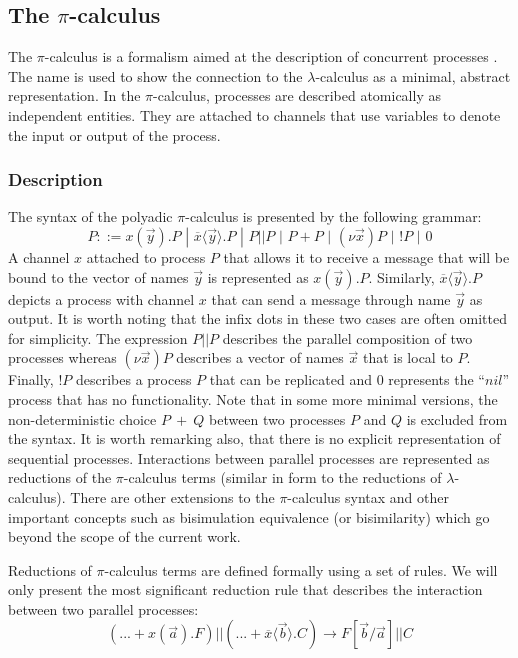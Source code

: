 \documentclass[copyright,creativecommons]{eptcs}
\begin{document}
\subsection{The $\pi$-calculus}
\label{pi}

The $\pi$-calculus is a formalism aimed at the description of concurrent processes \cite{milner1999communicating}. The name is used to show the connection to the $\lambda$-calculus as a minimal, abstract representation. In the $\pi$-calculus, processes are described atomically as independent entities. They are attached to channels that use variables to denote the input or output of the process. 

\subsubsection{Description}
\label{pidesc}


The syntax of the polyadic $\pi$-calculus is presented by the following grammar:
\[ 
P ::= x(\vec{y}).P \,\,|\,\, \overline{x} \langle \vec{y} \rangle.P \,\,|\,\, P || P \,\,|\,\, P + P \,\,|\,\,(\nu \vec{x})P \,\,|\,\, !P \,\,|\,\, 0 
  \]
A channel $x$ attached to process $P$ that allows it to receive a message that will be bound to the vector of names $\vec{y}$ is represented as $x(\vec{y}).P$. Similarly, $\overline{x} \langle \vec{y} \rangle.P$ depicts a process with channel $x$ that can send a message through name $\vec{y}$ as output. It is worth noting that the infix dots in these two cases are often omitted for simplicity. The expression $P || P$ describes the parallel composition of two processes whereas $(\nu \vec{x})P$ describes a vector of names $\vec{x}$ that is local to $P$. Finally, $!P$ describes a process $P$ that can be replicated and $0$ represents the ``$nil$'' process that has no functionality. Note that in some more minimal versions, the non-deterministic choice $P\ +\ Q$ between two processes $P$ and $Q$ is excluded from the syntax. It is worth remarking also, that there is no explicit representation of sequential processes. Interactions between parallel processes are represented as reductions of the $\pi$-calculus terms (similar in form to the reductions of $\lambda$-calculus). There are other extensions to the $\pi$-calculus syntax and other important concepts such as bisimulation equivalence (or bisimilarity) \cite{sangiorgi1996theory} which go beyond the scope of the current work.


Reductions of $\pi$-calculus terms are defined formally using a set of rules. We will only present the most significant reduction rule that describes the interaction between two parallel processes:
\begin{equation}
\label{pireduction}
 (... + x(\vec{a}).F) || (... + \overline{x} \langle \vec{b} \rangle .C) \rightarrow F[\vec{b}/\vec{a}] || C
\end{equation}
\end{document}
